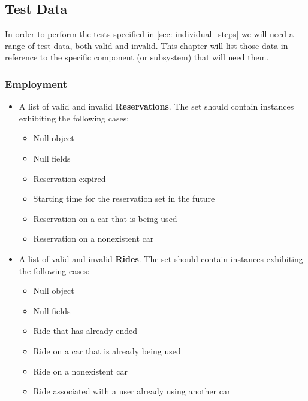 	
	\subsection{Test Data}
	
	In order to perform the tests specified in \autoref{sec: individual_steps} we will need a range of test data, both valid and invalid. This chapter will list those data in reference to the specific component (or subsystem) that will need them. %
	
	
	
		\subsubsection{Employment}
		
		\begin{itemize}
			\item A list of valid and invalid \textbf{Reservations}. The set should contain instances exhibiting the following cases:
				\begin{itemize}
					\item Null object
					\item Null fields
					\item Reservation expired
					\item Starting time for the reservation set in the future
					\item Reservation on a car that is being used
					\item Reservation on a nonexistent car
				\end{itemize}
		\end{itemize}
		
		\begin{itemize}
			\item A list of valid and invalid \textbf{Rides}. The set should contain instances exhibiting the following cases:
				\begin{itemize}
					\item Null object
					\item Null fields
					\item Ride that has already ended
					\item Ride on a car that is already being used
					\item Ride on a nonexistent car
					\item Ride associated with a user already using another car
				\end{itemize}
		\end{itemize}
		
